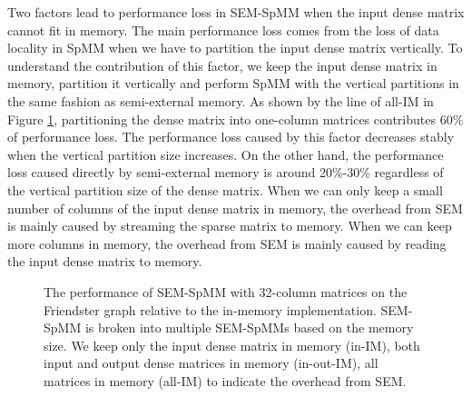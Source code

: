 Two factors lead to performance loss in SEM-SpMM when the input dense matrix
cannot fit in memory. The main performance loss comes from the loss of data
locality in SpMM when we have to partition the input dense matrix vertically.
To understand
the contribution of this factor, we keep the input dense matrix in memory,
partition it vertically and perform SpMM with the vertical partitions in
the same fashion as semi-external memory. As shown by the line of all-IM
in Figure \ref{perf:spmm32},
partitioning the dense matrix into one-column matrices contributes 60\%
of performance loss. The performance loss caused by this factor decreases
stably when the vertical partition size increases. On the other hand,
the performance loss caused directly by semi-external memory is around 20\%-30\%
regardless of the vertical partition size of the dense matrix. When we can only
keep a small number of columns of the input dense matrix in memory, the overhead
from SEM is mainly caused by streaming the sparse matrix to memory. When we can
keep more columns in memory, the overhead from SEM is mainly caused by reading
the input dense matrix to memory.

\begin{figure}
	\begin{center}
		\footnotesize
		
		\caption{The performance of SEM-SpMM with 32-column matrices on
			the Friendster graph relative to the in-memory implementation.
			SEM-SpMM is broken into multiple SEM-SpMMs based on the memory
			size. We keep only the input dense matrix in memory (in-IM),
			both input and output dense matrices in memory (in-out-IM),
			all matrices in memory (all-IM) to indicate the overhead from SEM.}
		\label{perf:spmm32}
	\end{center}
\end{figure}

%	
%	

